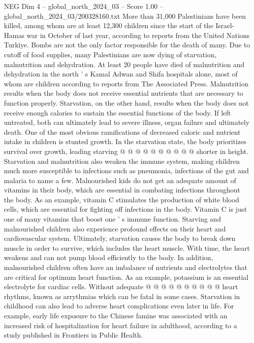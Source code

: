 \begin{textsample}{NEG Dim 4 – global\_north\_2024\_03 – Score 1.00 – global\_north\_2024\_03/200328160.txt}  \label{ex:f4_neg_218}
More than 31,000 Palestinians have been killed, among whom are at least 12,300 children since the start of the Israel-Hamas war in October of last year, according to reports from the United Nations Turkiye.
Bombs are not the only factor responsible for the death of many.
Due to cutoff of food supplies, many Palestinians are now dying of starvation, malnutrition and dehydration.
At least 20 people have died of malnutrition and dehydration in the north ' s Kamal Adwan and Shifa hospitals alone, most of whom are children according to reports from The Associated Press.
Malnutrition results when the body does not receive essential nutrients that are necessary to function properly.
Starvation, on the other hand, results when the body does not receive enough calories to sustain the essential functions of the body.
If left untreated, both can ultimately lead to severe illness, organ failure and ultimately death.
One of the most obvious ramifications of decreased caloric and nutrient intake in children is stunted growth.
In the starvation state, the body prioritizes survival over growth, leading starving @ @ @ @ @ @ @ @ @ @ shorter in height.
Starvation and malnutrition also weaken the immune system, making children much more susceptible to infections such as pneumonia, infections of the gut and malaria to name a few.
Malnourished kids do not get an adequate amount of vitamins in their body, which are essential in combating infections throughout the body.
As an example, vitamin C stimulates the production of white blood cells, which are essential for fighting off infections in the body.
Vitamin C is just one of many vitamins that boost one ' s immune function.
Starving and malnourished children also experience profound effects on their heart and cardiovascular system.
Ultimately, starvation causes the body to break down muscle in order to survive, which includes the heart muscle.
With time, the heart weakens and can not pump blood efficiently to the body.
In addition, malnourished children often have an imbalance of nutrients and electrolytes that are critical for optimum heart function.
As an example, potassium is an essential electrolyte for cardiac cells.
Without adequate @ @ @ @ @ @ @ @ @ @ heart rhythms, known as arrythmias which can be fatal in some cases.
Starvation in childhood can also lead to adverse heart complications even later in life.
For example, early life exposure to the Chinese famine was associated with an increased risk of hospitalization for heart failure in adulthood, according to a study published in Frontiers in Public Health.

\end{textsample}

